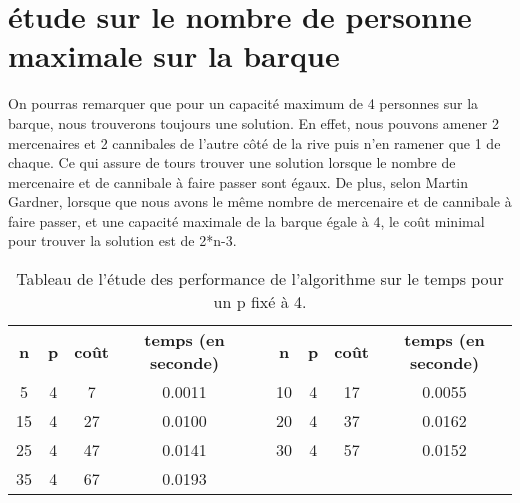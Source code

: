 \documentclass[a4paper, 12pt, french,oneside]{book}
\begin{document}
\section{étude sur le nombre de personne maximale sur la barque}
On pourras remarquer que pour un capacité maximum de 4 personnes sur la barque, nous trouverons toujours une solution. En effet, nous pouvons amener 2 mercenaires et 2 cannibales de l'autre côté de la rive puis n'en ramener que 1 de chaque. Ce qui assure de tours trouver une solution lorsque le nombre de mercenaire et de cannibale à faire passer sont égaux. De plus, selon Martin Gardner, lorsque que nous avons le même nombre de mercenaire et de cannibale à faire passer, et une capacité maximale de la barque égale à 4, le coût minimal pour trouver la solution est de 2*n-3.
\begin{table}[!ht]
    \caption{Tableau de l'étude des performance de l'algorithme sur le temps pour un p fixé à 4. }
    \renewcommand\arraystretch{1.2}
    \begin{tabularx}{\linewidth}{|c|c|c|c|X|c|c|c|c|}
        \cline{1-4}\cline{6-9}
        {\textbf{n}} & {\textbf{p}} & {\textbf{coût}} & {\textbf{temps (en seconde)}} &  & {\textbf{n}} & {\textbf{p}} & {\textbf{coût}} & {\textbf{temps (en seconde)}} \\
        \cline{1-4}\cline{6-9}


        5            & 4            & 7               & 0.0011                        &  &

        10           & 4            & 17              & 0.0055                                                                                                           \\

        15           & 4            & 27              & 0.0100                        &  &

        20           & 4            & 37              & 0.0162                                                                                                           \\

        25           & 4            & 47              & 0.0141                        &  &

        30           & 4            & 57              & 0.0152                                                                                                           \\

        35           & 4            & 67              & 0.0193                        &  &


\end{tabularx}
\end{table}
\end{document}
